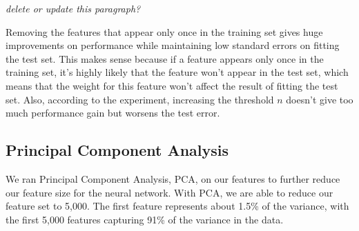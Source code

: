 \documentclass[journal]{IEEEtran}
\begin{document}
\textit{delete or update this paragraph?}
\par Removing the features that
appear only once in the training set gives huge improvements on performance
while maintaining low standard errors on fitting the test set. This makes sense
because if a
feature appears only once in the training set, it's highly likely that the
feature won't appear in the test set, which means that the weight for this feature
won't affect the result of fitting the test set. Also, according to the experiment,
increasing the threshold $n$ doesn't give too much performance gain but worsens
the test error.

\subsection{Principal Component Analysis}
We ran Principal Component Analysis, PCA, on our features to further reduce
our feature size for the neural network. With PCA, we
are able to reduce our feature set to 5,000.  The first feature
represents about 1.5\% of the variance, with the first 5,000 features
capturing 91\% of the variance in the data.
\\
\\
\end{document}
